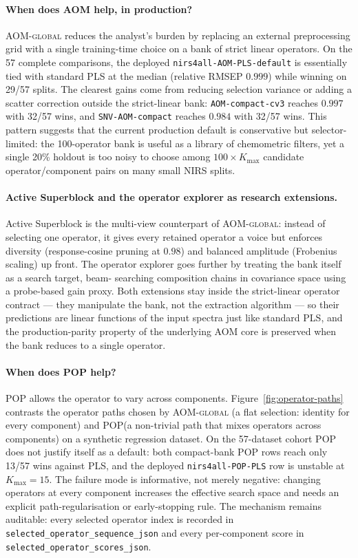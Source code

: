 \documentclass[review,a4paper]{elsarticle}
\newcommand{\AOM}{\textsc{AOM}\xspace}
\newcommand{\POP}{\textsc{POP}\xspace}
\newcommand{\PLS}{\textsc{PLS}\xspace}
\begin{document}
\paragraph{When does \AOM help, in production?}
\AOM-\textsc{global} reduces the analyst's burden by replacing an
external preprocessing grid with a single training-time choice on a
bank of strict linear operators. On the 57 complete comparisons, the
deployed \verb|nirs4all-AOM-PLS-default| is essentially tied with
standard \PLS at the median (relative RMSEP $0.999$) while winning on
29/57 splits. The clearest gains come from reducing selection variance
or adding a scatter correction outside the strict-linear bank:
\texttt{AOM-compact-cv3} reaches $0.997$ with 32/57 wins, and
\texttt{SNV-AOM-compact} reaches $0.984$ with 32/57 wins. This pattern
suggests that the current production default is conservative but
selector-limited: the 100-operator bank is useful as a library of
chemometric filters, yet a single 20\% holdout is too noisy to choose
among $100\times K_\text{max}$ candidate operator/component pairs on
many small NIRS splits.

\paragraph{Active Superblock and the operator explorer as research
extensions.}
Active Superblock is the multi-view counterpart of \AOM-\textsc{global}:
instead of selecting one operator, it gives every retained operator a
voice but enforces diversity (response-cosine pruning at $0.98$) and
balanced amplitude (Frobenius scaling) up front. The operator explorer
goes further by treating the bank itself as a search target, beam-
searching composition chains in covariance space using a probe-based
gain proxy. Both extensions stay inside the strict-linear operator
contract --- they manipulate the bank, not the extraction algorithm
--- so their predictions are linear functions of the input spectra
just like standard \PLS, and the production-parity property of the
underlying \AOM core is preserved when the bank reduces to a single
operator.

\paragraph{When does \POP help?}
\POP allows the operator to vary across components.
Figure~\ref{fig:operator-paths} contrasts the operator paths chosen by
\AOM-\textsc{global} (a flat selection: identity for every component)
and \POP (a non-trivial path that mixes operators across components)
on a synthetic regression dataset. On the 57-dataset cohort \POP does
not justify itself as a default: both compact-bank \POP rows reach only
13/57 wins against \PLS, and the deployed \texttt{nirs4all-POP-PLS}
row is unstable at $K_\text{max}=15$. The failure mode is informative,
not merely negative: changing operators at every component increases
the effective search space and needs an explicit path-regularisation
or early-stopping rule. The mechanism remains auditable: every selected
operator index is recorded in
\verb|selected_operator_sequence_json| and every per-component score
in \verb|selected_operator_scores_json|.
\end{document}
